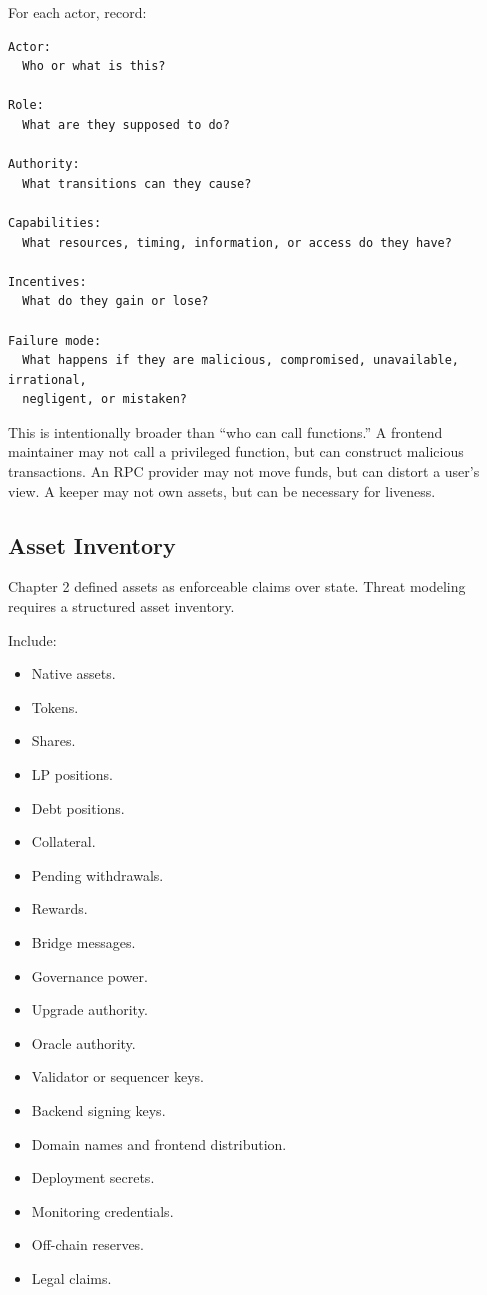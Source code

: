 For each actor, record:

\begin{lstlisting}
Actor:
  Who or what is this?

Role:
  What are they supposed to do?

Authority:
  What transitions can they cause?

Capabilities:
  What resources, timing, information, or access do they have?

Incentives:
  What do they gain or lose?

Failure mode:
  What happens if they are malicious, compromised, unavailable, irrational,
  negligent, or mistaken?
\end{lstlisting}

This is intentionally broader than ``who can call functions.'' A
frontend maintainer may not call a privileged function, but can
construct malicious transactions. An RPC provider may not move funds,
but can distort a user's view. A keeper may not own assets, but can be
necessary for liveness.

\subsection{Asset Inventory}

Chapter 2 defined assets as enforceable claims over state. Threat
modeling requires a structured asset inventory.

Include:

\begin{itemize}
\tightlist
\item
  Native assets.
\item
  Tokens.
\item
  Shares.
\item
  LP positions.
\item
  Debt positions.
\item
  Collateral.
\item
  Pending withdrawals.
\item
  Rewards.
\item
  Bridge messages.
\item
  Governance power.
\item
  Upgrade authority.
\item
  Oracle authority.
\item
  Validator or sequencer keys.
\item
  Backend signing keys.
\item
  Domain names and frontend distribution.
\item
  Deployment secrets.
\item
  Monitoring credentials.
\item
  Off-chain reserves.
\item
  Legal claims.
\end{itemize}

